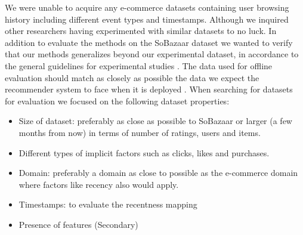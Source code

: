 We were unable to acquire any e-commerce datasets containing user browsing history including different
event types and timestamps. Although we inquired other researchers having experimented with similar
datasets to no luck. In addition to evaluate the methods on the SoBazaar dataset we wanted to verify that our
methods generalizes beyond our experimental dataset, in accordance to the general guidelines
for experimental studies \cite{Shani2011}. The data used for offline evaluation should match
as closely as possible the data we expect the recommender system to face when it is
deployed \cite{Gunawardana2009}. When searching for datasets for evaluation we focused on the
following dataset properties:

\begin{itemize}
	\item Size of dataset: preferably as close as possible to SoBazaar or larger (a few months from now)
	in terms of number of ratings, users and items.
	\item Different types of implicit factors such as clicks, likes and purchases.
	\item Domain: preferably a domain as close to possible as the e-commerce domain where
	factors like recency also would apply.
	\item Timestamps: to evaluate the recentness mapping
	\item Presence of features (Secondary)
\end{itemize}





